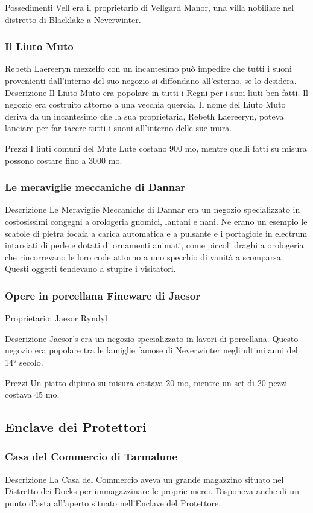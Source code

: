 \documentclass{article}
\begin{document}
Possedimenti
Vell era il proprietario di Vellgard Manor, una villa nobiliare nel distretto di Blacklake a Neverwinter.

\subsubsection{Il Liuto Muto}
Rebeth Laereeryn mezzelfo
con un incantesimo può impedire che tutti i suoni provenienti dall'interno del suo negozio si diffondano all'esterno, se lo desidera.
Descrizione
Il Liuto Muto era popolare in tutti i Regni per i suoi liuti ben fatti. Il negozio era costruito attorno a una vecchia quercia. Il nome del Liuto Muto deriva da un incantesimo che la sua proprietaria, Rebeth Laereeryn, poteva lanciare per far tacere tutti i suoni all'interno delle sue mura.

Prezzi
I liuti comuni del Mute Lute costano 900 mo, mentre quelli fatti su misura possono costare fino a 3000 mo.

\subsubsection{Le meraviglie meccaniche di Dannar}
Descrizione
Le Meraviglie Meccaniche di Dannar era un negozio specializzato in costosissimi congegni a orologeria gnomici, lantani e nani. Ne erano un esempio le scatole di pietra focaia a carica automatica e a pulsante e i portagioie in electrum intarsiati di perle e dotati di ornamenti animati, come piccoli draghi a orologeria che rincorrevano le loro code attorno a uno specchio di vanità a scomparsa. Questi oggetti tendevano a stupire i visitatori.


\subsubsection{Opere in porcellana Fineware di Jaesor}

Proprietario: Jaesor Ryndyl

Descrizione
Jaesor's era un negozio specializzato in lavori di porcellana. Questo negozio era popolare tra le famiglie famose di Neverwinter negli ultimi anni del 14° secolo.

Prezzi
Un piatto dipinto su misura costava 20 mo, mentre un set di 20 pezzi costava 45 mo.

\subsection{Enclave dei Protettori}
\subsubsection{Casa del Commercio di Tarmalune}Descrizione
La Casa del Commercio aveva un grande magazzino situato nel Distretto dei Docks per immagazzinare le proprie merci. Disponeva anche di un punto d'asta all'aperto situato nell'Enclave del Protettore.
\end{document}
